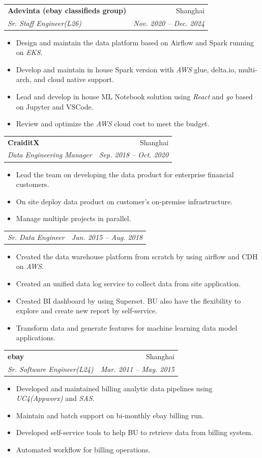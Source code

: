 \documentclass[a4paper,11pt]{article}
\makeatletter
\newcommand{\resumeItem}[1]{
  \item\small{
    {#1 \vspace{-2pt}}
  }
}
\newcommand{\resumeSubheading}[4]{
  \vspace{-2pt}\item
    \begin{tabular*}{0.97\textwidth}[t]{l@{\extracolsep{\fill}}r}
      \textbf{#1} & #2 \\
      \textit{\small#3} & \textit{\small #4} \\
    \end{tabular*}\vspace{-7pt}
}
\newcommand{\resumeSubSubheading}[2]{
    \item
    \begin{tabular*}{0.97\textwidth}{l@{\extracolsep{\fill}}r}
      \textit{\small#1} & \textit{\small #2} \\
    \end{tabular*}\vspace{-7pt}
}
\newcommand{\resumeSubHeadingListEnd}{\end{itemize}}
\newcommand{\resumeItemListStart}{\begin{itemize}}
\newcommand{\resumeItemListEnd}{\end{itemize}\vspace{-5pt}}
\makeatother
\begin{document}
    \resumeSubheading
      {Adevinta (ebay classifieds group)}{Shanghai}
      {Sr. Staff Engineer(L26)}{Nov. 2020 -- Dec. 2024}
      \resumeItemListStart
        \resumeItem{Design and maintain the data platform based on Airflow and Spark running on \emph{EKS}.}
	\resumeItem{Develop and maintain in house Spark version with \emph{AWS} glue, delta.io, multi-arch, and cloud native support.}
        \resumeItem{Lead and develop in house ML Notebook solution using \emph{React} and \emph{go} based on Jupyter and VSCode.}
        \resumeItem{Review and optimize the \emph{AWS} cloud cost to meet the budget.}
      \resumeItemListEnd
      

    \resumeSubheading
      {CraiditX}{Shanghai}
      {Data Engineering Manager}{Sep. 2018 -- Oct. 2020}
      \resumeItemListStart
        \resumeItem{Lead the team on developing the data product for enterprise financial customers.}
        \resumeItem{On site deploy data product on customer's on-premise infrastructure.} 
        \resumeItem{Manage multiple projects in parallel.}
      \resumeItemListEnd

      \resumeSubSubheading
          {Sr. Data Engineer}{Jun. 2015 -- Aug. 2018}
          \resumeItemListStart
          \resumeItem{Created the data warehouse platform from scratch by using airflow and CDH on \emph{AWS}.}
          \resumeItem{Created an unified data log service to collect data from site application.}
          \resumeItem{Created BI dashboard by using Superset. BU also have the flexibility to explore and create new report by self-service.}
          \resumeItem{Transform data and generate features for machine learning data model applications.}
          \resumeItemListEnd
      
    \resumeSubheading
      {ebay}{Shanghai}
      {Sr. Software Engineer(L24)}{Mar. 2011 -- May. 2015}
      \resumeItemListStart
        \resumeItem{Developed and maintained billing analytic data pipelines using \emph{UC4(Appworx)} and \emph{SAS}.}
        \resumeItem{Maintain and batch support on bi-monthly ebay billing run.}
        \resumeItem{Developed self-service tools to help BU to retrieve data from billing system.}
        \resumeItem{Automated workflow for billing operations.}
      \resumeItemListEnd
\end{document}
